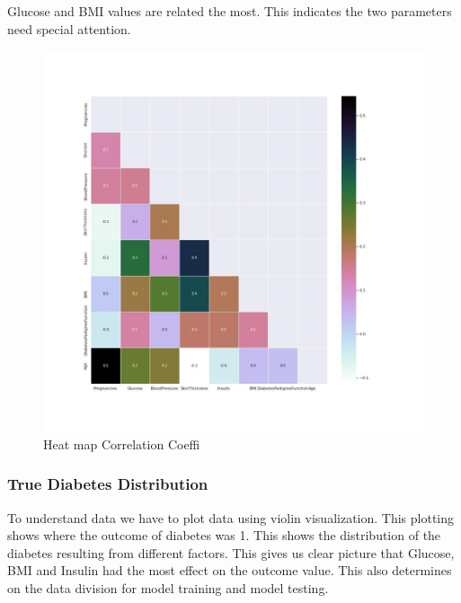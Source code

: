 \documentclass[
]{article}
\begin{document}
Glucose and BMI values are related the most. This indicates the two
parameters need special attention.

\begin{figure}
\centering
\includegraphics{Corr.jpg}
\caption{Heat map Correlation Coeffi}
\end{figure}

\hypertarget{true-diabetes-distribution}{%
\subsubsection{True Diabetes
Distribution}\label{true-diabetes-distribution}}

To understand data we have to plot data using violin visualization. This
plotting shows where the outcome of diabetes was 1. This shows the
distribution of the diabetes resulting from different factors. This
gives us clear picture that Glucose, BMI and Insulin had the most effect
on the outcome value. This also determines on the data division for
model training and model testing.
\end{document}

